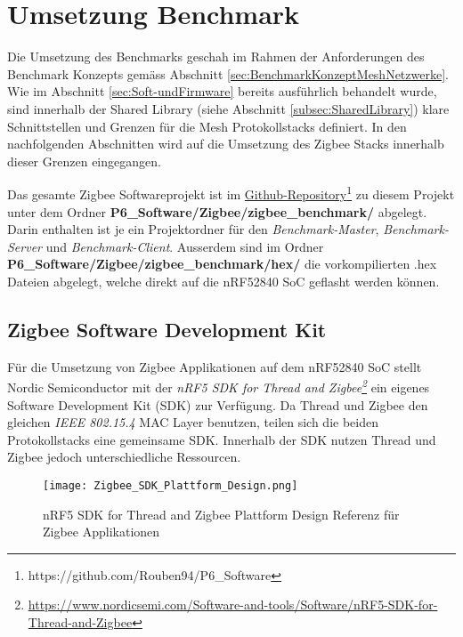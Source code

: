 \clearpage

\section{Umsetzung Benchmark}\label{sec:ZigbeeUmsetzungBenchmark}
Die Umsetzung des Benchmarks geschah im Rahmen der Anforderungen des Benchmark Konzepts gemäss Abschnitt \ref{sec:BenchmarkKonzeptMeshNetzwerke}.
Wie im Abschnitt \ref{sec:Soft-undFirmware} bereits ausführlich behandelt wurde, sind innerhalb der Shared Library (siehe Abschnitt \ref{subsec:SharedLibrary}) klare Schnittstellen und Grenzen für die Mesh Protokollstacks definiert.
In den nachfolgenden Abschnitten wird auf die Umsetzung des Zigbee Stacks innerhalb dieser Grenzen eingegangen.

Das gesamte Zigbee Softwareprojekt ist im \href{https://github.com/Rouben94/P6_Software}{Github-Repository\footnote{\url{https://github.com/Rouben94/P6_Software}\cite{anklin_bobst_horath_rouben94p6_software_nodate}}} zu diesem Projekt unter dem Ordner \textbf{P6\_Software/Zigbee/zigbee\_benchmark/} abgelegt.
Darin enthalten ist je ein Projektordner für den \textit{Benchmark-Master}, \textit{Benchmark-Server} und \textit{Benchmark-Client}.
Ausserdem sind im Ordner \textbf{P6\_Software/Zigbee/zigbee\_benchmark/hex/} die vorkompilierten .hex Dateien abgelegt, welche direkt auf die nRF52840 SoC geflasht werden können. 

\subsection{Zigbee Software Development Kit}\label{subsec:ZigbeeSoftwareDevelopmentKit}
Für die Umsetzung von Zigbee Applikationen auf dem nRF52840 SoC stellt Nordic Semiconductor mit der \textit{nRF5 SDK for Thread and Zigbee\footnote{\url{https://www.nordicsemi.com/Software-and-tools/Software/nRF5-SDK-for-Thread-and-Zigbee}\cite{nordic_semi_nrf_sdk_for_thread_and_zigbee_2020}}} ein eigenes Software Development Kit (SDK) zur Verfügung.
Da Thread und Zigbee den gleichen \textit{IEEE 802.15.4} MAC Layer benutzen, teilen sich die beiden Protokollstacks eine gemeinsame SDK.
Innerhalb der SDK nutzen Thread und Zigbee jedoch unterschiedliche Ressourcen.

\begin{figure}[h]
	\centering
	\texttt{[image: Zigbee\_SDK\_Plattform\_Design.png]}
	\caption{nRF5 SDK for Thread and Zigbee Plattform Design Referenz für Zigbee Applikationen \cite{nordic_semi_nrf_sdk_for_thread_and_zigbee_2020}}
	\label{fig:ZigbeePlattformDesign}
\end{figure}

